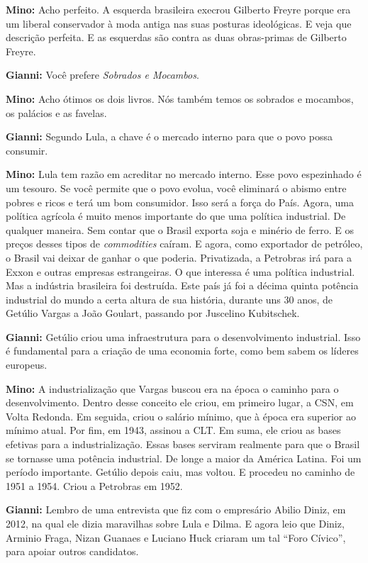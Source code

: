 \textbf{Mino:} Acho perfeito. A esquerda brasileira execrou Gilberto
Freyre porque era um liberal conservador à moda antiga nas suas posturas
ideológicas. E veja que descrição perfeita. E as esquerdas são contra as
duas obras-primas de Gilberto Freyre.

\textbf{Gianni:} Você prefere \emph{Sobrados e Mocambos}.

\textbf{Mino:} Acho ótimos os dois livros. Nós também temos os sobrados
e mocambos, os palácios e as favelas.

\textbf{Gianni:} Segundo Lula, a chave é o mercado interno para que o
povo possa consumir.

\textbf{Mino:} Lula tem razão em acreditar no mercado interno. Esse povo
espezinhado é um tesouro. Se você permite que o povo evolua, você
eliminará o abismo entre pobres e ricos e terá um bom consumidor. Isso
será a força do País. Agora, uma política agrícola é muito menos
importante do que uma política industrial. De qualquer maneira. Sem
contar que o Brasil exporta soja e minério de ferro. E os preços desses
tipos de \emph{commodities} caíram. E agora, como exportador de
petróleo, o Brasil vai deixar de ganhar o que poderia. Privatizada, a
Petrobras irá para a Exxon e outras empresas estrangeiras. O que
interessa é uma política industrial. Mas a indústria brasileira foi
destruída. Este país já foi a décima quinta potência industrial do mundo
a certa altura de sua história, durante uns 30 anos, de Getúlio Vargas a
João Goulart, passando por Juscelino Kubitschek.

\textbf{Gianni:} Getúlio criou uma infraestrutura para o desenvolvimento
industrial. Isso é fundamental para a criação de uma economia forte,
como bem sabem os líderes europeus.

\textbf{Mino:} A industrialização que Vargas buscou era na época o
caminho para o desenvolvimento. Dentro desse conceito ele criou, em
primeiro lugar, a CSN, em Volta Redonda. Em seguida, criou o salário
mínimo, que à época era superior ao mínimo atual. Por fim, em 1943,
assinou a CLT. Em suma, ele criou as bases efetivas para a
industrialização. Essas bases serviram realmente para que o Brasil se
tornasse uma potência industrial. De longe a maior da América Latina.
Foi um período importante. Getúlio depois caiu, mas voltou. E procedeu
no caminho de 1951 a 1954. Criou a Petrobras em 1952.

\textbf{Gianni:} Lembro de uma entrevista que fiz com o empresário
Abilio Diniz, em 2012, na qual ele dizia maravilhas sobre Lula e Dilma.
E agora leio que Diniz, Arminio Fraga, Nizan Guanaes e Luciano Huck
criaram um tal ``Foro Cívico'', para apoiar outros candidatos.

